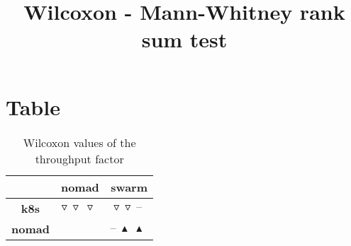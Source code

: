\documentclass{article}
\title{Wilcoxon - Mann-Whitney rank sum test}
\author{}
\begin{document}
\maketitle
\section{Table}
\begin{table}[!htp]
  \caption{Wilcoxon values of the throughput factor}
  \label{table:throughput}
  \centering
  \begin{scriptsize}
  \begin{tabular}{c|cc}
      & \textbf{nomad} & \textbf{swarm} \\\hline
      \textbf{k8s} & $\triangledown\ \triangledown\ \triangledown\  $ & $ \triangledown\ \triangledown\ \text{--}\ $ \\
      \textbf{nomad} & $ $ & $ \text{--}\ \blacktriangle\ \blacktriangle\ $ \\
  \end{tabular}
  \end{scriptsize}
\end{table}
\end{document}
